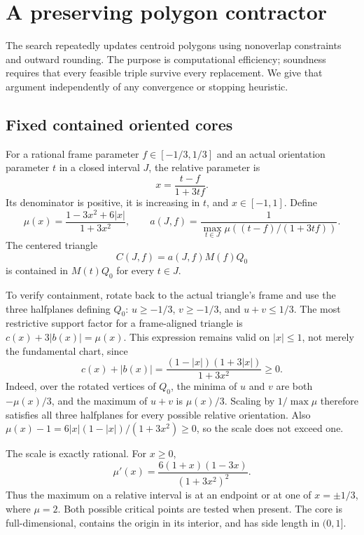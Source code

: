 \documentclass[11pt]{article}
\begin{document}
\section{A preserving polygon contractor}\label{sec:contractor}

The search repeatedly updates centroid polygons using nonoverlap constraints and outward rounding. The purpose is computational efficiency; soundness requires that every feasible triple survive every replacement. We give that argument independently of any convergence or stopping heuristic.

\subsection{Fixed contained oriented cores}

For a rational frame parameter $f\in[-1/3,1/3]$ and an actual orientation parameter $t$ in a closed interval $J$, the relative parameter is
\begin{equation}\label{eq:relative}
 x=\frac{t-f}{1+3tf}.
\end{equation}
Its denominator is positive, it is increasing in $t$, and $x\in[-1,1]$. Define
\[
 \mu(x)=\frac{1-3x^2+6|x|}{1+3x^2},\qquad
 a(J,f)=\frac1{\max_{t\in J}\mu((t-f)/(1+3tf))}.
\]
The centered triangle
\begin{equation}\label{eq:core}
 C(J,f)=a(J,f)M(f)Q_0
\end{equation}
is contained in $M(t)Q_0$ for every $t\in J$.

To verify containment, rotate back to the actual triangle's frame and use the three halfplanes defining $Q_0$: $u\ge-1/3$, $v\ge-1/3$, and $u+v\le1/3$. The most restrictive support factor for a frame-aligned triangle is $c(x)+3|b(x)|=\mu(x)$. This expression remains valid on $|x|\le1$, not merely the fundamental chart, since
\[
 c(x)+|b(x)|=\frac{(1-|x|)(1+3|x|)}{1+3x^2}\ge0.
\]
Indeed, over the rotated vertices of $Q_0$, the minima of $u$ and $v$ are both $-\mu(x)/3$, and the maximum of $u+v$ is $\mu(x)/3$. Scaling by $1/\max\mu$ therefore satisfies all three halfplanes for every possible relative orientation. Also $\mu(x)-1=6|x|(1-|x|)/(1+3x^2)\ge0$, so the scale does not exceed one.

The scale is exactly rational. For $x\ge0$,
\[
 \mu'(x)=\frac{6(1+x)(1-3x)}{(1+3x^2)^2}.
\]
Thus the maximum on a relative interval is at an endpoint or at one of $x=\pm1/3$, where $\mu=2$. Both possible critical points are tested when present. The core is full-dimensional, contains the origin in its interior, and has side length in $(0,1]$.
\end{document}
